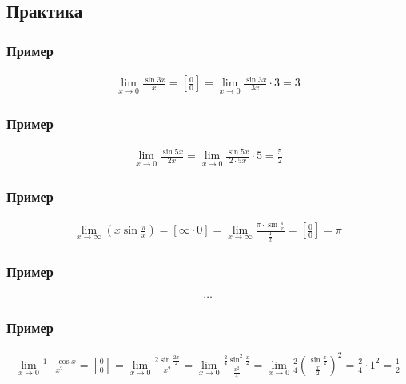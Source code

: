 \documentclass{article}
\begin{document}
\subsection{Практика}

\subsubsection{Пример}
\begin{gather*}
    \lim_{x \to 0} \frac{\sin 3x}{x} =
    \left[ \frac{0}{0} \right] =
    \lim_{x \to 0} \frac{\sin 3x}{3x} \cdot 3 = 3
\end{gather*}

\subsubsection{Пример}
\begin{gather*}
    \lim_{x \to 0} \frac{\sin 5x}{2x} =
    \lim_{x \to 0} \frac{\sin 5x}{2 \cdot 5x} \cdot 5 = \frac{5}{2}
\end{gather*}

\subsubsection{Пример}
\begin{gather*}
    \lim_{x \to \infty} \left( x \sin \frac{\pi}{x} \right) =
    [\infty \cdot 0] =
    \lim_{x \to \infty} \frac{\pi \cdot \sin \frac{\pi}{x}}{\frac{1}{x}} =
    \left[ \frac{0}{0} \right] = \pi
\end{gather*}

\subsubsection{Пример}
\begin{gather*}
    \dots
\end{gather*}

\subsubsection{Пример}
\begin{gather*}
    \lim_{x \to 0} \frac{1 - \cos x}{x^2} =
    \left[ \frac{0}{0} \right] =
    \lim_{x \to 0} \frac{2 \sin \frac{2x}{2}}{x^2} =
    \lim_{x \to 0} \frac{\frac{2}{4} \sin^2 \frac{x}{2}}{\frac{x^2}{4}} =
    \lim_{x \to 0} \frac{2}{4} \left( \frac{\sin \frac{x}{2}}{\frac{x}{2}} \right)^2 =
    \frac{2}{4} \cdot 1^2 = \frac{1}{2}
\end{gather*}
\end{document}
